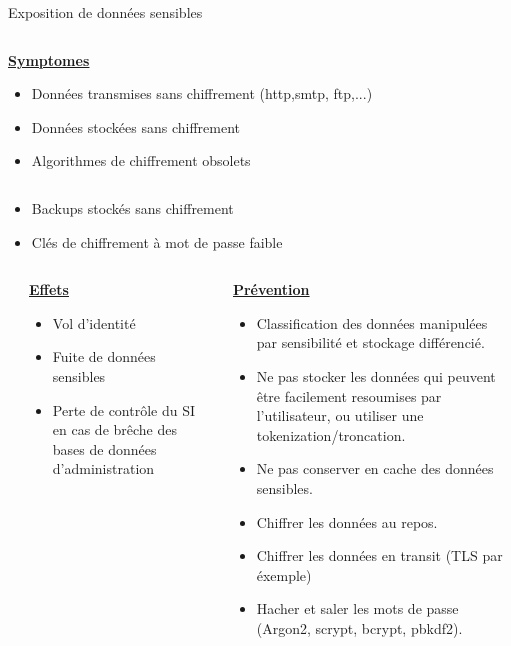 \documentclass[final,hyperref={pdfpagelabels=false}]{beamer}
\begin{document}
\begin{frame}[t]
\begin{columns}[t]
\begin{column}{.465\textwidth}
\begin{block}{Exposition de données sensibles}
\begin{columns}[T]
		\begin{column}{.875\textwidth}
			\uline{\uline{\textbf{Symptomes}}}
			\begin{itemize}
				\item Données transmises sans chiffrement (http,smtp, ftp,...)
				\item Données stockées sans chiffrement
				\item Algorithmes de chiffrement obsolets 
			\end{itemize}
		\end{column}
	\end{columns}
	\begin{itemize}
		\item Backups stockés sans chiffrement 
		\item Clés de chiffrement à mot de passe faible
	\end{itemize}
	\begin{columns}[T]
		\begin{column}{.01\textwidth}
		\end{column}
		\begin{column}{0.495\textwidth}
			\vfill
			\uline{\textbf{Effets}}
			\begin{itemize}
				\item Vol d'identité
				\item Fuite de données sensibles
				\item Perte de contrôle du SI en cas de brêche des bases de données d'administration
			\end{itemize}
			\vfill
		\end{column}
		\begin{column}{0.495\textwidth}
			\vfill
			\uline{\textbf{Prévention}}
			\begin{itemize}
				\item Classification des données manipulées par sensibilité et stockage différencié.
				\item Ne pas stocker les données qui peuvent être facilement resoumises par l'utilisateur, ou utiliser une tokenization/troncation.
				\item Ne pas conserver en cache des données sensibles.
				\item Chiffrer les données au repos.
				\item Chiffrer les données en transit (TLS par éxemple)
				\item Hacher et saler les mots de passe (Argon2, scrypt, bcrypt, pbkdf2).
			\end{itemize}
		\end{column}
	\end{columns}




\end{block}
\end{column}
\end{columns}
\end{frame}
\end{document}
